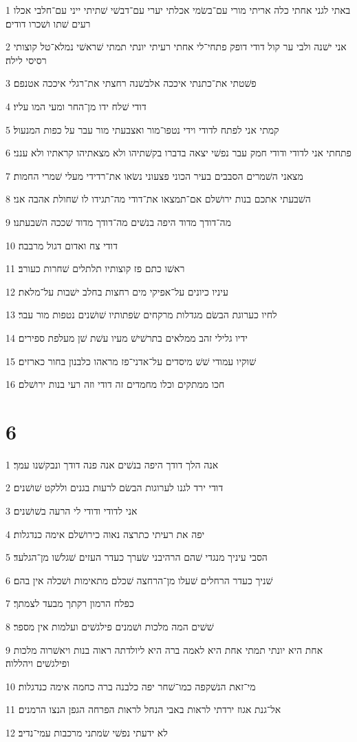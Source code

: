 \par 1 באתי לגני אחתי כלה אריתי מורי עם־בשׂמי אכלתי יערי עם־דבשׁי שׁתיתי ייני עם־חלבי אכלו רעים שׁתו ושׁכרו דודים׃
\par 2 אני ישׁנה ולבי ער קול דודי דופק פתחי־לי אחתי רעיתי יונתי תמתי שׁראשׁי נמלא־טל קוצותי רסיסי לילה׃
\par 3 פשׁטתי את־כתנתי איככה אלבשׁנה רחצתי את־רגלי איככה אטנפם׃
\par 4 דודי שׁלח ידו מן־החר ומעי המו עליו׃
\par 5 קמתי אני לפתח לדודי וידי נטפו־מור ואצבעתי מור עבר על כפות המנעול׃
\par 6 פתחתי אני לדודי ודודי חמק עבר נפשׁי יצאה בדברו בקשׁתיהו ולא מצאתיהו קראתיו ולא ענני׃
\par 7 מצאני השׁמרים הסבבים בעיר הכוני פצעוני נשׂאו את־רדידי מעלי שׁמרי החמות׃
\par 8 השׁבעתי אתכם בנות ירושׁלם אם־תמצאו את־דודי מה־תגידו לו שׁחולת אהבה אני׃
\par 9 מה־דודך מדוד היפה בנשׁים מה־דודך מדוד שׁככה השׁבעתנו׃
\par 10 דודי צח ואדום דגול מרבבה׃
\par 11 ראשׁו כתם פז קוצותיו תלתלים שׁחרות כעורב׃
\par 12 עיניו כיונים על־אפיקי מים רחצות בחלב ישׁבות על־מלאת׃
\par 13 לחיו כערוגת הבשׂם מגדלות מרקחים שׂפתותיו שׁושׁנים נטפות מור עבר׃
\par 14 ידיו גלילי זהב ממלאים בתרשׁישׁ מעיו עשׁת שׁן מעלפת ספירים׃
\par 15 שׁוקיו עמודי שׁשׁ מיסדים על־אדני־פז מראהו כלבנון בחור כארזים׃
\par 16 חכו ממתקים וכלו מחמדים זה דודי וזה רעי בנות ירושׁלם׃

\chapter{6}

\par 1 אנה הלך דודך היפה בנשׁים אנה פנה דודך ונבקשׁנו עמך׃
\par 2 דודי ירד לגנו לערוגות הבשׂם לרעות בגנים וללקט שׁושׁנים׃
\par 3 אני לדודי ודודי לי הרעה בשׁושׁנים׃
\par 4 יפה את רעיתי כתרצה נאוה כירושׁלם אימה כנדגלות׃
\par 5 הסבי עיניך מנגדי שׁהם הרהיבני שׂערך כעדר העזים שׁגלשׁו מן־הגלעד׃
\par 6 שׁניך כעדר הרחלים שׁעלו מן־הרחצה שׁכלם מתאימות ושׁכלה אין בהם׃
\par 7 כפלח הרמון רקתך מבעד לצמתך׃
\par 8 שׁשׁים המה מלכות ושׁמנים פילגשׁים ועלמות אין מספר׃
\par 9 אחת היא יונתי תמתי אחת היא לאמה ברה היא ליולדתה ראוה בנות ויאשׁרוה מלכות ופילגשׁים ויהללוה׃
\par 10 מי־זאת הנשׁקפה כמו־שׁחר יפה כלבנה ברה כחמה אימה כנדגלות׃
\par 11 אל־גנת אגוז ירדתי לראות באבי הנחל לראות הפרחה הגפן הנצו הרמנים׃
\par 12 לא ידעתי נפשׁי שׂמתני מרכבות עמי־נדיב׃

